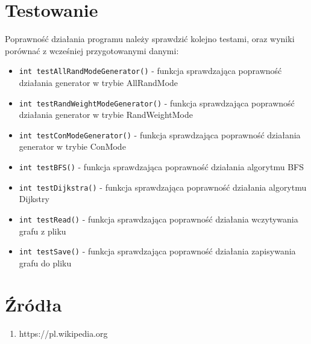 \documentclass{article}
\begin{document}
\section{Testowanie}
Poprawność działania programu należy sprawdzić kolejno testami, oraz wyniki porównać z wcześniej przygotowanymi danymi:
\begin{itemize}
    \item \texttt{int testAllRandModeGenerator()} - funkcja sprawdzająca poprawność działania generator w trybie AllRandMode
    \item \texttt{int testRandWeightModeGenerator()} - funkcja sprawdzająca poprawność działania generator w trybie RandWeightMode
    \item \texttt{int testConModeGenerator()} - funkcja sprawdzająca poprawność działania generator w trybie ConMode
    \item \texttt{int testBFS()} - funkcja sprawdzająca poprawność działania algorytmu BFS
    \item \texttt{int testDijkstra()} - funkcja sprawdzająca poprawność działania algorytmu Dijkstry 
    \item \texttt{int testRead()} - funkcja sprawdzająca poprawność działania wczytywania grafu z pliku
    \item \texttt{int testSave()} - funkcja sprawdzająca poprawność działania zapisywania grafu do pliku

\end{itemize}

\section{Źródła}
\begin{enumerate}
    \item https://pl.wikipedia.org
\end{enumerate}
\end{document}
